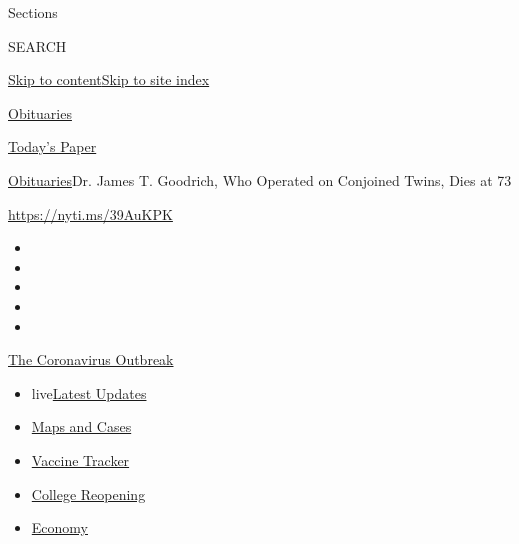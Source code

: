 Sections

SEARCH

\protect\hyperlink{site-content}{Skip to
content}\protect\hyperlink{site-index}{Skip to site index}

\href{https://www.nytimes.com/section/obituaries}{Obituaries}

\href{https://myaccount.nytimes.com/auth/login?response_type=cookie\&client_id=vi}{}

\href{https://www.nytimes.com/section/todayspaper}{Today's Paper}

\href{/section/obituaries}{Obituaries}\textbar{}Dr. James T. Goodrich,
Who Operated on Conjoined Twins, Dies at 73

\url{https://nyti.ms/39AuKPK}

\begin{itemize}
\item
\item
\item
\item
\item
\end{itemize}

\href{https://www.nytimes.com/news-event/coronavirus?action=click\&pgtype=Article\&state=default\&region=TOP_BANNER\&context=storylines_menu}{The
Coronavirus Outbreak}

\begin{itemize}
\tightlist
\item
  live\href{https://www.nytimes.com/2020/08/03/world/coronavirus-covid-19.html?action=click\&pgtype=Article\&state=default\&region=TOP_BANNER\&context=storylines_menu}{Latest
  Updates}
\item
  \href{https://www.nytimes.com/interactive/2020/us/coronavirus-us-cases.html?action=click\&pgtype=Article\&state=default\&region=TOP_BANNER\&context=storylines_menu}{Maps
  and Cases}
\item
  \href{https://www.nytimes.com/interactive/2020/science/coronavirus-vaccine-tracker.html?action=click\&pgtype=Article\&state=default\&region=TOP_BANNER\&context=storylines_menu}{Vaccine
  Tracker}
\item
  \href{https://www.nytimes.com/2020/08/02/us/covid-college-reopening.html?action=click\&pgtype=Article\&state=default\&region=TOP_BANNER\&context=storylines_menu}{College
  Reopening}
\item
  \href{https://www.nytimes.com/live/2020/08/03/business/stock-market-today-coronavirus?action=click\&pgtype=Article\&state=default\&region=TOP_BANNER\&context=storylines_menu}{Economy}
\end{itemize}

